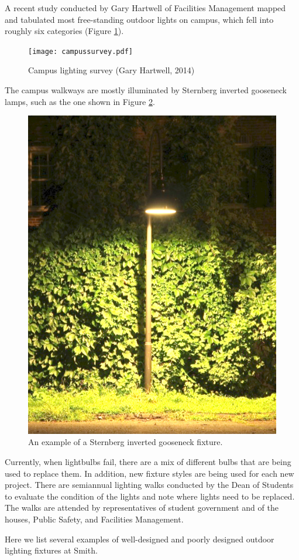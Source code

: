 \documentclass[12pt, oneside]{article}
\begin{document}
A recent study conducted by Gary Hartwell of Facilities Management mapped and tabulated most free-standing outdoor lights on campus, which fell into roughly six categories (Figure \ref{campus survey}).
 \begin{figure}[p]
	\centering
	\texttt{[image: campussurvey.pdf]}
	\caption[Campus lighting survey]{Campus lighting survey (Gary Hartwell, 2014)}
	\label{campus survey}
\end{figure}
The campus walkways are mostly illuminated by Sternberg inverted gooseneck lamps, such as the one shown in Figure \ref{gooseneck}.
 \begin{figure}[p]
	\centering
	\includegraphics[width=.5\textwidth]{Gooseneck.png}
	\caption[Gooseneck light]{An example of a Sternberg inverted gooseneck fixture.}
	\label{gooseneck}
\end{figure}
Currently, when lightbulbs fail, there are a mix of different bulbs that are being used to replace them. In addition, new fixture styles are being used for each new project. 
There are semiannual lighting walks conducted by the Dean of Students to evaluate the condition of the lights and note where lights need to be replaced. The walks are attended by representatives of student government and of the houses, Public Safety, and Facilities Management.

Here we list several examples of well-designed and poorly designed outdoor lighting fixtures at Smith.
\end{document}
